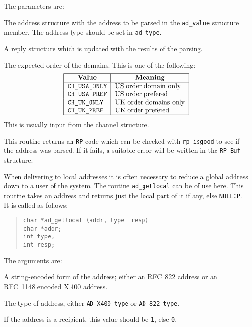 The parameters are:
\begin{describe}
\item[\verb|ap|:] The address structure with the address to be parsed
in the \verb|ad_value| structure member. The address type should be
set in \verb|ad_type|.
\item[\verb|rp|:] A reply structure which is updated with the results
of the parsing.
\item[\verb|order|:] The expected order of the domains. This is one of
the following:
\[\begin{tabular}{|l|l|}
\hline
	\multicolumn{1}{|c|}{\bf Value}&
		\multicolumn{1}{|c|}{\bf Meaning}\\
\hline
	\tt CH\_USA\_ONLY&	US order domain only\\
	\tt CH\_USA\_PREF&	US order prefered \\
	\tt CH\_UK\_ONLY&	UK order domains only\\
	\tt CH\_UK\_PREF&	UK order prefered \\
\hline
\end{tabular}\]
This is usually input from the channel structure.
\end{describe}

This routine returns an \verb|RP| code which can be checked with
\verb|rp_isgood| to see if the address was parsed. If it fails, a
suitable error will be written in the \verb|RP_Buf| structure.

When delivering to local addresses it is often necessary to reduce a
global address down to a user of the system. The routine
\verb|ad_getlocal| can be of use here. This routine takes an address
and returns just the local part of it if any, else \verb|NULLCP|. It
is called as follows:

\begin{quote}\begin{verbatim}
char *ad_getlocal (addr, type, resp)
char *addr;
int type;
int resp;
\end{verbatim}\end{quote}

The arguments are:
\begin{describe}
\item[\verb|addr|:] A string-encoded form of the address; either an
RFC~822 address or an RFC~1148 encoded X.400 address.

\item[\verb|type|:] The type of address, either \verb|AD_X400_type| or
\verb|AD_822_type|.

\item[\verb|resp|:] If the address is a recipient, this value should
be \verb|1|, else \verb|0|.
\end{describe}

